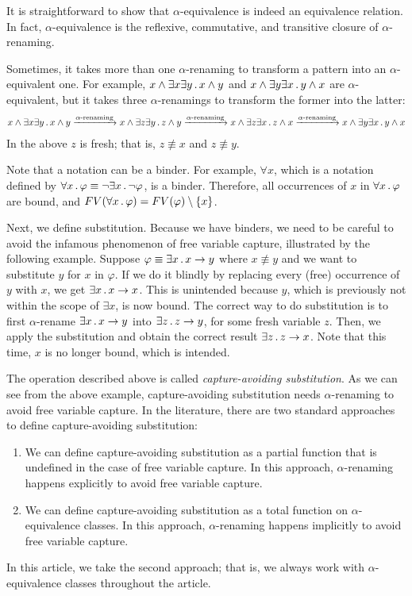 \documentclass{article}
\begin{document}
It is straightforward to show that $\alpha$-equivalence
is indeed an equivalence relation. 
In fact, $\alpha$-equivalence is the reflexive, commutative, and transitive
closure of $\alpha$-renaming. 

Sometimes, it takes more than one $\alpha$-renaming to transform
a pattern into an $\alpha$-equivalent one. 
For example, $x \land \exists x \exists y \,.\, x \land y$
and $x \land \exists y \exists x \,.\, y \land x$ are $\alpha$-equivalent,
but it takes three $\alpha$-renamings to transform the former into the latter:
\begin{align}
x \land \exists x \exists y \,.\, x \land y
\xrightarrow{\text{$\alpha$-renaming}}
x \land \exists z \exists y \,.\, z \land y
\xrightarrow{\text{$\alpha$-renaming}}
x \land \exists z \exists x \,.\, z \land x
\xrightarrow{\text{$\alpha$-renaming}}
x \land \exists y \exists x \,.\, y \land x
\end{align}
In the above $z$ is fresh; that is, $z \not\equiv x$ and $z \not\equiv y$. 

Note that a notation can be a binder. 
For example, $\forall x$, which is a notation defined by
$\forall x \,.\, \varphi \equiv \neg \exists x \,.\, \neg \varphi$,
is a binder.
Therefore, all occurrences of $x$ in $\forall x \,.\, \varphi$ are bound,
and $FV(\forall x \,.\, \varphi) = FV(\varphi) \setminus \{x\}$. 

Next, we define substitution. 
Because we have binders, we need to be careful to avoid the
infamous phenomenon of free variable capture,
illustrated by the following example.
Suppose $\varphi \equiv \exists x \,.\, x \to y$
where $x \not\equiv y$
and we want to substitute $y$ for $x$ in $\varphi$.
If we do it blindly by replacing every (free) occurrence of $y$ with $x$,
we get
$\exists x \,.\, x \to x$. 
This is unintended because $y$, which is previously not within the scope of $\exists x$, is now bound. 
The correct way to do substitution 
is to first $\alpha$-rename
$\exists x \,.\, x \to y$ into $\exists z \,.\, z \to y$, for some fresh variable $z$. 
Then, we apply the substitution and obtain the correct result
$\exists z \,.\, z \to x$. 
Note that this time, $x$ is no longer bound, which is intended. 

The operation described above is called \emph{capture-avoiding substitution}. 
As we can see from the above example, capture-avoiding substitution needs
$\alpha$-renaming to avoid free variable capture.
In the literature, there are two standard
approaches to define capture-avoiding substitution:
\begin{enumerate}
\item We can define capture-avoiding substitution as a partial function 
      that is undefined in the case of free variable capture.
      In this approach, $\alpha$-renaming happens explicitly to avoid free variable capture. 
\item We can define capture-avoiding substitution as a total function
      on $\alpha$-equivalence classes. In this approach, $\alpha$-renaming
      happens implicitly to avoid free variable capture. 
\end{enumerate}
In this article, we take the second approach;
that is, we always work with $\alpha$-equivalence classes 
throughout the article. 
\end{document}

